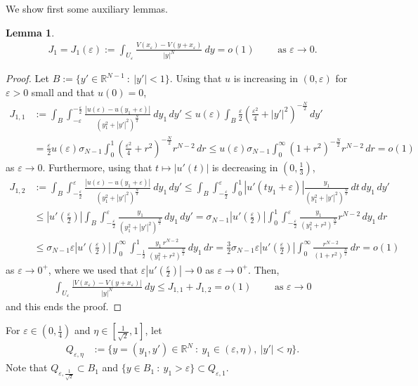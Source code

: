 \documentclass[11pt]{article}
\newcommand{\eps}{{\varepsilon}}
\newcommand{\R}{\mathbb{R}}
\numberwithin{equation}{section}
\newtheorem{lemma}[theorem]{Lemma}
\begin{document}
We show first some auxiliary lemmas.
\begin{lemma}\label{J1}
\begin{align*}
J_1=J_1(\eps):=\int_{U_\eps} \frac{V(x_\eps)-V(y+x_\eps)}{|y|^N}\ dy=o(1)\qquad \text{ as }\eps\to 0.
\end{align*}
\end{lemma}
\begin{proof}
Let $B:=\{y'\in \R^{N-1}\::\: |y'|<1\}$. Using that $u$ is increasing in $(0,\eps)$ for $\eps>0$ small and that $u(0)=0$,
\begin{align*}
J_{1,1}&:=
\int_{B}\int_{-\eps}^{-\frac{\eps}{2}}\frac{|u(\eps)-u(y_1+\eps)|}{(y_1^2+|y'|^2)^{\frac{N}{2}}}\ dy_1\,dy'
\leq u(\eps)\int_{B} \frac{\eps}{2}\left(\frac{\eps^2}{4}+|y'|^2\right)^{-\frac{N}{2}}\,dy'\\
&=\frac{\eps}{2}u(\eps)\sigma_{N-1}\int_{0}^1 \left(\frac{\eps^2}{4}+r^2\right)^{-\frac{N}{2}}r^{N-2}\,dr
\leq u(\eps)\sigma_{N-1}\int_{0}^\infty \left(1+r^2\right)^{-\frac{N}{2}}r^{N-2}\,dr=o(1)
\end{align*}
as $\eps\to 0$. Furthermore, using that $t\mapsto|u'(t)|$ is decreasing in $(0,\frac{1}{3})$,
\begin{align*}
J_{1,2}
&:=\int_{B}\int_{-\frac{\eps}{2}}^\eps\frac{\left|u(\eps)-u(y_1+\eps)\right|}{(y_1^2+|y'|^2)^{\frac{N}{2}}}\ dy_1\,dy'
\leq \int_{B}\int_{-\frac{\eps}{2}}^\eps \int_0^1 |u'(ty_1+\eps)|\frac{y_1}{(y_1^2+|y'|^2)^{\frac{N}{2}}}\,dt\, dy_1\,dy'\\
&\leq |u'(\tfrac{\eps}{2})|\int_{B}\int_{-\frac{\eps}{2}}^\eps \frac{y_1}{(y_1^2+|y'|^2)^{\frac{N}{2}}}\, dy_1\,dy'
 =\sigma_{N-1}|u'(\tfrac{\eps}{2})|\int_{0}^1\int_{-\frac{\eps}{2}}^\eps \frac{y_1}{(y_1^2+r^2)^{\frac{N}{2}}}r^{N-2}\, dy_1\,dr\\
 &\leq \sigma_{N-1}\eps|u'(\tfrac{\eps}{2})|\int_{0}^\infty \int_{-\frac{1}{2}}^1 \frac{y_1\,r^{N-2}}{(y_1^2+r^2)^{\frac{N}{2}}}\, dy_1\,dr
 =\frac{3}{2}\sigma_{N-1}\eps|u'(\tfrac{\eps}{2})|\int_{0}^\infty \frac{r^{N-2}}{(1+r^2)^{\frac{N}{2}}}\,dr
 =o(1)
\end{align*}
as $\eps\to 0^+$, where we used that $\eps|u'(\tfrac{\eps}{2})|\to 0$ as $\eps\to 0^+$. Then,
\begin{align}\label{lem211}
\int_{U_\eps} \frac{|V(x_\eps)-V(y+x_\eps)|}{|y|^N}\ dy\leq J_{1,1}+J_{1,2}=o(1)\qquad \text{ as $\eps\to 0$}
\end{align}
 and this ends the proof.
\end{proof}


For $\eps\in(0,\frac{1}{4})$ and $\eta\in\left[\frac{1}{\sqrt{2}},1\right]$, let
\begin{align*}
Q_{\eps,\eta}&:=\{y=(y_1,y')\in \R^N\::\: y_1\in(\eps,\eta),\ |y'|<\eta\}.
\end{align*}
Note that $Q_{\eps,\frac{1}{\sqrt{2}}}\subset B_1$ and $\{y\in B_1\::\: y_1>\eps\}\subset Q_{\eps,1}$.
\end{document}
